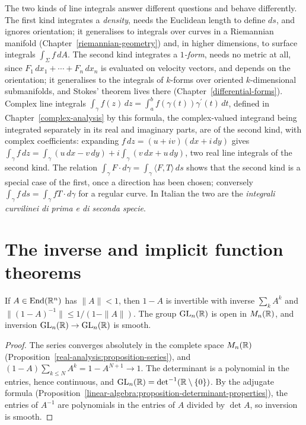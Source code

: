 \begin{remark}\label{real-analysis:remark-two-kinds}
The two kinds of line integrals answer different questions and behave differently. The first kind integrates a \emph{density}, needs the Euclidean length to define $ds$, and ignores orientation; it
generalises to integrals over curves in a Riemannian manifold (Chapter~\ref{riemannian-geometry}) and, in higher dimensions, to surface integrals $\int_\Sigma f\,dA$. The second kind integrates a
\emph{$1$-form}, needs no metric at all, since $F_1\,dx_1 + \cdots + F_n\,dx_n$ is evaluated on velocity vectors, and depends on the orientation; it generalises to the integrals of $k$-forms over oriented
$k$-dimensional submanifolds, and Stokes' theorem lives there (Chapter~\ref{differential-forms}). Complex line integrals $\int_\gamma f(z)\,dz = \int_a^bf(\gamma(t))\gamma^{\prime}(t)\,dt$, defined in Chapter~\ref{complex-analysis} by this formula, the complex-valued integrand being integrated
separately in its real and imaginary parts, are of the second kind, with complex coefficients: expanding $f\,dz = (u + iv)(dx + i\,dy)$ gives
$\int_\gamma f\,dz = \int_\gamma(u\,dx - v\,dy) + i\int_\gamma(v\,dx + u\,dy)$, two real line integrals of the second kind. The relation $\int_\gamma F \cdot d\gamma = \int_\gamma\langle F, T\rangle\,ds$ shows that the second kind is a special case of the first, once a
direction has been chosen; conversely $\int_\gamma f\,ds = \int_\gamma fT \cdot d\gamma$ for a regular curve. In Italian the two are the \emph{integrali curvilinei di prima e di seconda specie}.
\end{remark}

\section{The inverse and implicit function theorems}\label{real-analysis:section-inverse-function}

\begin{lemma}\label{real-analysis:lemma-neumann}
If $A \in \operatorname{End}(\mathbb{R}^n)$ has $\|A\| < 1$, then $1 - A$ is invertible with inverse $\sum_kA^k$ and $\|(1 - A)^{-1}\| \leq 1/(1 - \|A\|)$. The group $\mathrm{GL}_n(\mathbb{R})$ is open in $M_n(\mathbb{R})$, and
inversion $\mathrm{GL}_n(\mathbb{R}) \to \mathrm{GL}_n(\mathbb{R})$ is smooth.
\end{lemma}

\begin{proof}
The series converges absolutely in the complete space $M_n(\mathbb{R})$ (Proposition~\ref{real-analysis:proposition-series}), and $(1 - A)\sum_{k \leq N}A^k = 1 - A^{N+1} \to 1$. The determinant is a polynomial in the
entries, hence continuous, and $\mathrm{GL}_n(\mathbb{R}) = \det^{-1}(\mathbb{R} \setminus \{0\})$. By the adjugate formula (Proposition~\ref{linear-algebra:proposition-determinant-properties}), the entries of $A^{-1}$ are
polynomials in the entries of $A$ divided by $\det A$, so inversion is smooth.
\end{proof}

